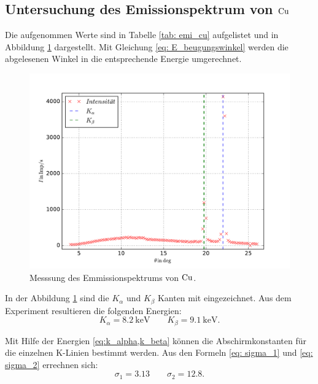 \FloatBarrier
\subsection{Untersuchung des Emissionspektrum von $\ce{Cu}$}
Die aufgenommen Werte sind in Tabelle \ref{tab: emi_cu} aufgelistet und in Abbildung \ref{fig: emission_cu} dargestellt.
Mit Gleichung \eqref{eq: E_beugungswinkel} werden die abgelesenen Winkel in die entsprechende Energie umgerechnet.

\begin{figure}
  \centering
  \includegraphics[width=1 \textwidth]{../Messdaten/emission_cu.pdf}
  \caption{Messsung des Emmissionspektrums von $\ce{Cu}$.}
  \label{fig: emission_cu}
\end{figure}
In der Abbildung \ref{fig: emission_cu} sind die $K_\alpha$ und $K_\beta$ Kanten mit eingezeichnet. %
Aus dem Experiment resultieren die folgenden Energien:
\begin{equation}
  \label{eq:k_alpha,k_beta}
  K_\alpha=\SI{8.2}{\kilo\eV} \qquad   K_\beta=\SI{9.1}{\kilo\eV}.
\end{equation}

Mit Hilfe der Energien \eqref{eq:k_alpha,k_beta} können die Abschirmkonstanten %
für die einzelnen K-Linien bestimmt werden. %
Aus den Formeln \eqref{eq: sigma_1} und \eqref{eq: sigma_2} errechnen sich: %
\begin{equation}
   \label{eq:abschirm}
   \sigma_1=3.13 \qquad \sigma_2=12.8.
\end{equation}

